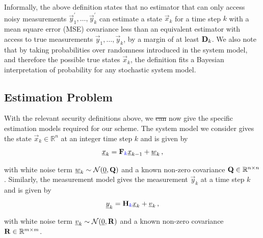\documentclass[letterpaper, 10 pt, conference]{ieeeconf}
\providecommand{\DIFadd}[1]{{\protect\color{blue}\uwave{#1}}} %
\providecommand{\DIFdel}[1]{{\protect\color{red}\sout{#1}}}                      %
\providecommand{\DIFaddbegin}{} %
\providecommand{\DIFaddend}{} %
\providecommand{\DIFdelbegin}{} %
\providecommand{\DIFdelend}{} %
\newcommand{\DIFscaledelfig}{0.5}
\newlength{\DIFdelgraphicswidth} %
\newlength{\DIFdelgraphicsheight} %
\newcommand{\DIFaddincludegraphics}[2][]{{\color{blue}\fbox{\DIFOincludegraphics[#1]{#2}}}} %
\newcommand{\DIFdelincludegraphics}[2][]{%
\sbox{\DIFdelgraphicsbox}{\DIFOincludegraphics[#1]{#2}}%
\settoboxwidth{\DIFdelgraphicswidth}{\DIFdelgraphicsbox} %
\settoboxtotalheight{\DIFdelgraphicsheight}{\DIFdelgraphicsbox} %
\scalebox{\DIFscaledelfig}{%
\parbox[b]{\DIFdelgraphicswidth}{\usebox{\DIFdelgraphicsbox}\\[-\baselineskip] \rule{\DIFdelgraphicswidth}{0em}}\llap{\resizebox{\DIFdelgraphicswidth}{\DIFdelgraphicsheight}{%
\setlength{\unitlength}{\DIFdelgraphicswidth}%
\begin{picture}(1,1)%
\thicklines\linethickness{2pt} %
{\color[rgb]{1,0,0}\put(0,0){\framebox(1,1){}}}%
{\color[rgb]{1,0,0}\put(0,0){\line( 1,1){1}}}%
{\color[rgb]{1,0,0}\put(0,1){\line(1,-1){1}}}%
\end{picture}%
}\hspace*{3pt}}} %
} %
\DeclareRobustCommand{\DIFaddbegin}{\DIFOaddbegin \let\includegraphics\DIFaddincludegraphics} %
\DeclareRobustCommand{\DIFaddend}{\DIFOaddend \let\includegraphics\DIFOincludegraphics} %
\DeclareRobustCommand{\DIFdelbegin}{\DIFOdelbegin \let\includegraphics\DIFdelincludegraphics} %
\DeclareRobustCommand{\DIFdelend}{\DIFOaddend \let\includegraphics\DIFOincludegraphics} %
\begin{document}
Informally, the above definition states that no estimator that can only access noisy measurements $\vec{y}^\prime_1,\dots,\vec{y}^\prime_k$ can estimate a state $\vec{x}_k$ for a time step $k$ with a mean square error (MSE) covariance less than an equivalent estimator with access to true measurements $\vec{y}_1,\dots,\vec{y}_k$, by a margin of at least ${{\mathbf{D}}}_k$. We also note that by taking probabilities over randomness introduced in the system model, and therefore the possible true states $\vec{x}_k$, the definition fits a Bayesian interpretation of probability for any stochastic system model.

% 
% 

\subsection{Estimation Problem}
With the relevant security definitions above, we \DIFdelbegin \DIFdel{can }\DIFdelend now give the specific estimation models required for our scheme. The system model we consider gives the state $\vec{x}_k\in\mathbb{R}^n$ at an integer time step $k$ and is given by
\begin{equation}\label{eqn:linear_system_model}
   \vec{x}_k = \mat{F}\DIFaddbegin \DIFadd{_k}\DIFaddend \vec{x}_{k-1} + \vec{w}_k\,,
\end{equation}
with white noise term \DIFdelbegin \DIFdel{${\underline{w}}_k\sim \mathcal{N}({\underline{0}}, {{\mathbf{Q}}})$ }\DIFdelend \DIFaddbegin \DIFadd{$\vec{w}_k\sim \mathcal{N}(\vec{0}, \mat{Q}_k)$ }\DIFaddend and a known non-zero covariance \DIFdelbegin \DIFdel{${{\mathbf{Q}}}\in \mathbb{R}^{n\times n}$}\DIFdelend \DIFaddbegin \DIFadd{$\mat{Q}_k\in \mathbb{R}^{n\times n}$}\DIFaddend . Similarly, the measurement model gives the measurement $\vec{y}_k$ at a time step $k$ and is given by
\begin{equation}\label{eqn:linear_measurement_model}
   \vec{y}_k = \mat{H}\DIFaddbegin \DIFadd{_k}\DIFaddend \vec{x}_k + \vec{v}_k\,,
\end{equation}
with white noise term \DIFdelbegin \DIFdel{${\underline{v}}_k\sim \mathcal{N}({\underline{0}}, {{\mathbf{R}}})$ }\DIFdelend \DIFaddbegin \DIFadd{$\vec{v}_k\sim \mathcal{N}(\vec{0}, \mat{R}_k)$ }\DIFaddend and a known non-zero covariance \DIFdelbegin \DIFdel{${{\mathbf{R}}}\in \mathbb{R}^{m\times m}$}\DIFdelend \DIFaddbegin \DIFadd{$\mat{R}_k\in \mathbb{R}^{m\times m}$}\DIFaddend .
\end{document}

